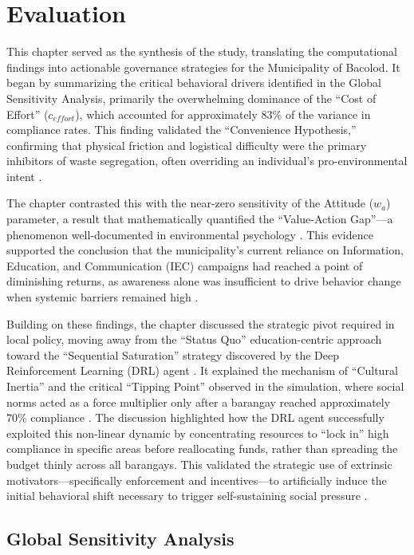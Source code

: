 \chapter{Evaluation}
This chapter served as the synthesis of the study, translating the computational findings into actionable governance strategies for the Municipality of Bacolod. It began by summarizing the critical behavioral drivers identified in the Global Sensitivity Analysis, primarily the overwhelming dominance of the ``Cost of Effort'' ($c_{effort}$), which accounted for approximately 83\% of the variance in compliance rates. This finding validated the ``Convenience Hypothesis,'' confirming that physical friction and logistical difficulty were the primary inhibitors of waste segregation, often overriding an individual's pro-environmental intent \citep{Yazawa2025}. 

The chapter contrasted this with the near-zero sensitivity of the Attitude ($w_a$) parameter, a result that mathematically quantified the ``Value-Action Gap''—a phenomenon well-documented in environmental psychology \citep{Zhao2022}. This evidence supported the conclusion that the municipality’s current reliance on Information, Education, and Communication (IEC) campaigns had reached a point of diminishing returns, as awareness alone was insufficient to drive behavior change when systemic barriers remained high \citep{Moeini2023}.

Building on these findings, the chapter discussed the strategic pivot required in local policy, moving away from the ``Status Quo'' education-centric approach toward the ``Sequential Saturation'' strategy discovered by the Deep Reinforcement Learning (DRL) agent \citep{ZhengAI2022}. It explained the mechanism of ``Cultural Inertia'' and the critical ``Tipping Point'' observed in the simulation, where social norms acted as a force multiplier only after a barangay reached approximately 70\% compliance \citep{Nyborg2024}. The discussion highlighted how the DRL agent successfully exploited this non-linear dynamic by concentrating resources to ``lock in'' high compliance in specific areas before reallocating funds, rather than spreading the budget thinly across all barangays. This validated the strategic use of extrinsic motivators—specifically enforcement and incentives—to artificially induce the initial behavioral shift necessary to trigger self-sustaining social pressure \citep{Andre2021}.

\section{Global Sensitivity Analysis}

